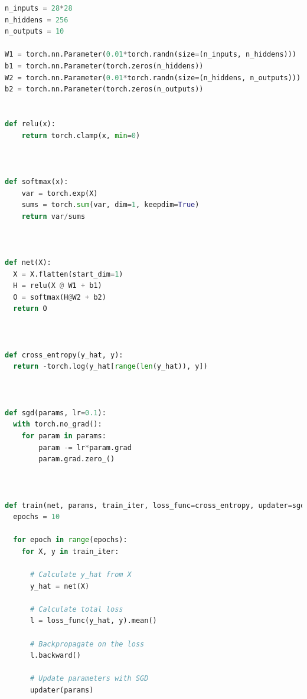 \documentclass[submit]{harvardml}
\begin{document}
\begin{lstlisting}[language=Python]
n_inputs = 28*28
n_hiddens = 256
n_outputs = 10 

W1 = torch.nn.Parameter(0.01*torch.randn(size=(n_inputs, n_hiddens))) 
b1 = torch.nn.Parameter(torch.zeros(n_hiddens))
W2 = torch.nn.Parameter(0.01*torch.randn(size=(n_hiddens, n_outputs))) 
b2 = torch.nn.Parameter(torch.zeros(n_outputs)) 


def relu(x):
    return torch.clamp(x, min=0)



def softmax(x):
    var = torch.exp(X)
    sums = torch.sum(var, dim=1, keepdim=True)
    return var/sums



def net(X):
  X = X.flatten(start_dim=1)
  H = relu(X @ W1 + b1)
  O = softmax(H@W2 + b2)
  return O



def cross_entropy(y_hat, y):
  return -torch.log(y_hat[range(len(y_hat)), y])



def sgd(params, lr=0.1):
  with torch.no_grad():
    for param in params:
        param -= lr*param.grad
        param.grad.zero_()



def train(net, params, train_iter, loss_func=cross_entropy, updater=sgd):
  epochs = 10
  
  for epoch in range(epochs):
    for X, y in train_iter:
      
      # Calculate y_hat from X
      y_hat = net(X)
    
      # Calculate total loss
      l = loss_func(y_hat, y).mean()

      # Backpropagate on the loss
      l.backward()
        
      # Update parameters with SGD  
      updater(params)

\end{lstlisting}
\end{document}
